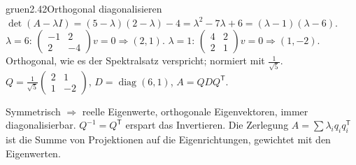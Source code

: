 \begin{loesungkarte}{gruen}{2.42}{Orthogonal diagonalisieren}
$\det(A - \lambda I) = (5 - \lambda)(2 - \lambda) - 4 = \lambda^{2} - 7\lambda + 6 = (\lambda - 1)(\lambda - 6)$.
$\lambda = 6$: $\begin{pmatrix}-1 & 2\\ 2 & -4\end{pmatrix}v = 0\Rightarrow(2, 1)$. $\lambda = 1$: $\begin{pmatrix}4 & 2\\ 2 & 1\end{pmatrix}v = 0\Rightarrow(1, -2)$. Orthogonal, wie es der Spektralsatz verspricht; normiert mit $\frac1{\sqrt5}$.
$Q = \frac1{\sqrt5}\begin{pmatrix}2 & 1\\ 1 & -2\end{pmatrix}$, $D = \operatorname{diag}(6, 1)$, $A = QDQ^{\mathsf T}$.
\begin{mitnehmen}\kastentext
Symmetrisch $\Rightarrow$ reelle Eigenwerte, orthogonale Eigenvektoren, immer diagonalisierbar. $Q^{-1} = Q^{\mathsf T}$ erspart das Invertieren. Die Zerlegung $A = \sum\lambda_iq_iq_i^{\mathsf T}$ ist die Summe von Projektionen auf die Eigenrichtungen, gewichtet mit den Eigenwerten.
\end{mitnehmen}
\end{loesungkarte}

